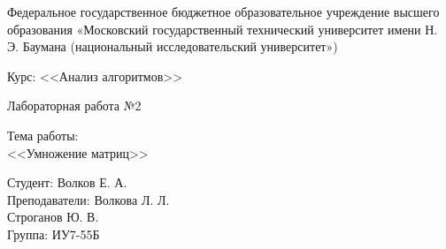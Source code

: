 \documentclass[a4paper,12pt]{article}
\begin{document}



\large
\begin{center}
Федеральное государственное бюджетное образовательное учреждение высшего образования «Московский государственный технический университет имени Н. Э. Баумана (национальный исследовательский университет»)
\end{center}

\vspace*{30mm} 

\LARGE
\begin{center}
Курс: <<Анализ алгоритмов>>

Лабораторная работа №2
\end{center}

\vspace*{30mm} 

\huge
\begin{center}
Тема работы:\\
<<Умножение матриц>>
\end{center}
\vspace*{30mm} 

\large
\begin{flushright}
Студент: Волков Е. А. \\
Преподаватели: Волкова Л. Л. \\
				Строганов Ю. В. \\
Группа: ИУ7-55Б
\end{flushright}
\end{document}
